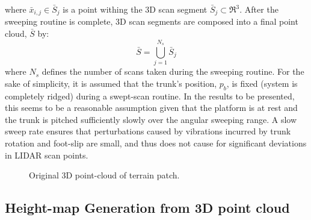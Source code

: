 			where $\bar{x}_{i,j} \in \bar{S}_{j}$ is a point withing the 3D \Jth scan segment $\bar{S}_{j} \subset \Re^{3}$. After the sweeping routine is complete, 3D scan segments are composed into a final point cloud, $\bar{S}$ by:
			\begin{equation}
				\bar{S} = \bigcup_{j=1}^{N_{s}} \bar{S}_{j}
			\end{equation}
			where $N_{s}$ defines the number of scans taken during the sweeping routine. For the sake of simplicity, it is assumed that the trunk's position, $p_{b}$, is fixed (system is completely ridged) during a swept-scan routine. In the results to be presented, this seems to be a reasonable assumption given that the platform is at rest and the trunk is pitched sufficiently slowly over the angular sweeping range. A slow sweep rate ensures that perturbations caused by vibrations incurred by trunk rotation and foot-slip are small, and thus does not cause for significant deviations in LIDAR scan points.
				\begin{figure}[h!]
					\centering
					\caption{Original 3D point-cloud of terrain patch.}
					\label{fig::pointcloud_terrain_patch}
				\end{figure}


		\subsection{Height-map Generation from 3D point cloud}
			
